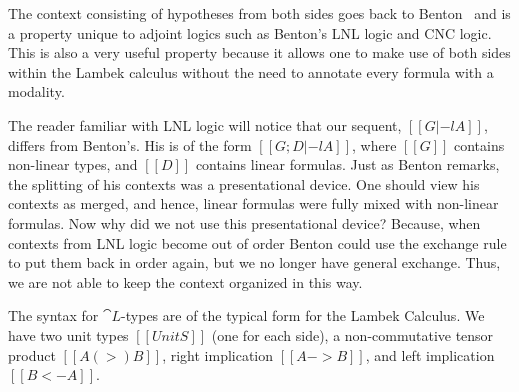 The context consisting of hypotheses from both sides goes back to
Benton~\cite{Benton:1994} and is a property unique to adjoint logics such as
Benton's LNL logic and CNC logic. This is also a very useful property
because it allows one to make use of both sides within the Lambek calculus
without the need to annotate every formula with a modality.

The reader familiar with LNL logic will notice that our sequent,
$[[G |-l A]]$, differs from Benton's. His is of the form $[[G; D |-l A]]$,
where $[[G]]$ contains non-linear types, and $[[D]]$ contains linear
formulas. Just as Benton remarks, the splitting of his contexts was a
presentational device. One should view his contexts as merged, and hence,
linear formulas were fully mixed with non-linear formulas. Now why did we
not use this presentational device? Because, when contexts from LNL logic
become out of order Benton could use the exchange rule to put them back in
order again, but we no longer have general exchange. Thus, we are not able
to keep the context organized in this way.

The syntax for $\cat{L}$-types are of the typical form for the Lambek
Calculus. We have two unit types $[[UnitS]]$ (one for each side), a
non-commutative tensor product $[[A (>) B]]$, right implication
$[[A -> B]]$, and left implication $[[B <- A]]$.

